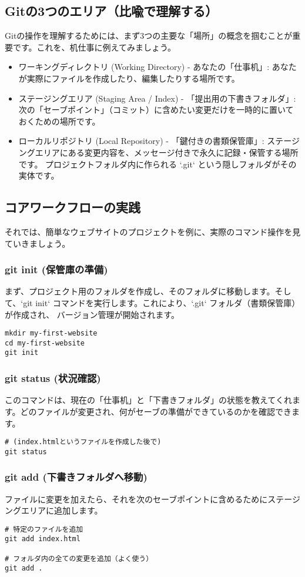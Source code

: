 \documentclass{ltjsarticle}
\begin{document}
\subsection{Gitの3つのエリア（比喩で理解する）}
Gitの操作を理解するためには、まず3つの主要な「場所」の概念を掴むことが重要です。これを、机仕事に例えてみましょう。
\begin{itemize}
    \item ワーキングディレクトリ (Working Directory) - あなたの「仕事机」: あなたが実際にファイルを作成したり、編集したりする場所です。
    \item ステージングエリア (Staging Area / Index) - 「提出用の下書きフォルダ」: 次の「セーブポイント」（コミット）に含めたい変更だけを一時的に置いておくための場所です。
    \item ローカルリポジトリ (Local Repository) - 「鍵付きの書類保管庫」: ステージングエリアにある変更内容を、メッセージ付きで永久に記録・保管する場所です。
    プロジェクトフォルダ内に作られる `.git` という隠しフォルダがその実体です。
\end{itemize}

\subsection{コアワークフローの実践}
それでは、簡単なウェブサイトのプロジェクトを例に、実際のコマンド操作を見ていきましょう。
\subsubsection{git init (保管庫の準備)}
まず、プロジェクト用のフォルダを作成し、そのフォルダに移動します。そして、`git init` コマンドを実行します。これにより、`.git` フォルダ（書類保管庫）が作成され、
バージョン管理が開始されます。
\begin{verbatim}
mkdir my-first-website
cd my-first-website
git init
\end{verbatim}

\subsubsection{git status (状況確認)}
このコマンドは、現在の「仕事机」と「下書きフォルダ」の状態を教えてくれます。どのファイルが変更され、何がセーブの準備ができているのかを確認できます。
\begin{verbatim}
# (index.htmlというファイルを作成した後で)
git status
\end{verbatim}

\subsubsection{git add (下書きフォルダへ移動)}
ファイルに変更を加えたら、それを次のセーブポイントに含めるためにステージングエリアに追加します。
\begin{verbatim}
# 特定のファイルを追加
git add index.html

# フォルダ内の全ての変更を追加（よく使う）
git add .
\end{verbatim}
\end{document}
